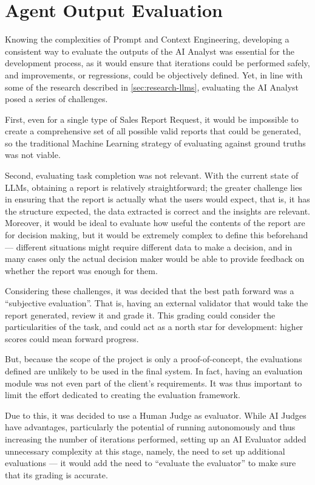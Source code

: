 \documentclass[a4paper]{report}
\begin{document}
\section{Agent Output Evaluation}
\label{sec:agent-evals}

Knowing the complexities of Prompt and Context Engineering, developing a consistent way to evaluate the outputs of the AI Analyst was essential for the development process, as it would ensure that iterations could be performed safely, and improvements, or regressions, could be objectively defined. Yet, in line with some of the research described in \autoref{sec:research-llms}, evaluating the AI Analyst posed a series of challenges.

First, even for a single type of Sales Report Request, it would be impossible to create a comprehensive set of all possible valid reports that could be generated, so the traditional Machine Learning strategy of evaluating against ground truths was not viable.

Second, evaluating task completion was not relevant. With the current state of LLMs, obtaining a report is relatively straightforward; the greater challenge lies in ensuring that the report is actually what the users would expect, that is, it has the structure expected, the data extracted is correct and the insights are relevant. Moreover, it would be ideal to evaluate how useful the contents of the report are for decision making, but it would be extremely complex to define this beforehand --- different situations might require different data to make a decision, and in many cases only the actual decision maker would be able to provide feedback on whether the report was enough for them.

Considering these challenges, it was decided that the best path forward was a ``subjective evaluation''. That is, having an external validator that would take the report generated, review it and grade it. This grading could consider the particularities of the task, and could act as a north star for development: higher scores could mean forward progress.

But, because the scope of the project is only a proof-of-concept, the evaluations defined are unlikely to be used in the final system. In fact, having an evaluation module was not even part of the client's requirements. It was thus important to limit the effort dedicated to creating the evaluation framework.

Due to this, it was decided to use a Human Judge as evaluator. While AI Judges have advantages, particularly the potential of running autonomously and thus increasing the number of iterations performed, setting up an AI Evaluator added unnecessary complexity at this stage, namely, the need to set up additional evaluations --- it would add the need to ``evaluate the evaluator'' to make sure that its grading is accurate.
\end{document}
